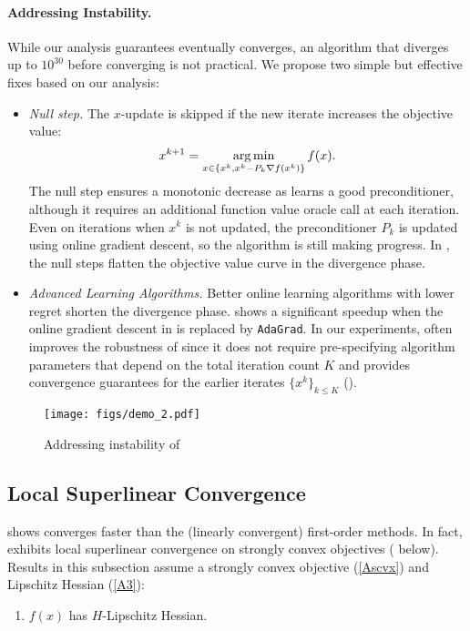 \paragraph{Addressing Instability.} While our analysis guarantees {\hdm}  eventually converges, an algorithm that diverges up to $10^{30}$ before converging is not practical. We propose two simple but effective fixes based on our analysis:

\begin{itemize}[leftmargin=10pt]
\item \emph{Null step.} 
The $x$-update is skipped if the new iterate increases the objective value:
 \begin{equation} \label{eqn:null-step}
 x^{k + 1} = \displaystyle \argmin_{x \in \{x^k, x^k - P_k \nabla f(x^k)\}} f(x).
 \end{equation}
The null step ensures a monotonic decrease as {\hdm} learns a good preconditioner, although it requires an additional function value oracle call at each iteration. 
Even on iterations when $x^k$ is not updated, 
the preconditioner $P_k$ is updated using online gradient descent, so the algorithm is still making progress.
In , the null steps  flatten the objective value curve in the divergence phase.

\item \emph{Advanced Learning Algorithms.} Better online learning algorithms with lower regret shorten the divergence phase.  shows a significant speedup when the online gradient descent in  is replaced by \texttt{AdaGrad}.
In our experiments, {\adagrad} often improves the robustness of {\hdm} since it does not require pre-specifying algorithm parameters that depend on the total iteration count $K$
and provides convergence guarantees for the earlier iterates $\{ x^k \}_{k \leq K}$ ().
\end{itemize}
\begin{figure}
\centering
\texttt{[image: figs/demo\_2.pdf]}	
\caption{Addressing instability of {\hdm} \label{fig:instablity}}
\end{figure}
\subsection{Local Superlinear Convergence} \label{sec:local-conv}
 shows {\hdm} converges faster than the (linearly convergent) first-order methods. In fact, {\hdm} exhibits local superlinear convergence on strongly convex objectives ( below). Results in this subsection assume a strongly convex objective (\ref{Ascvx}) and Lipschitz Hessian (\ref{A3}):
\begin{enumerate}[leftmargin=30pt,label=\textbf{A\arabic*:},ref=\rm{\textbf{A\arabic*}},start=4]
  \item $f (x)$ has $H$-Lipschitz Hessian. \label{A3}
\end{enumerate}

